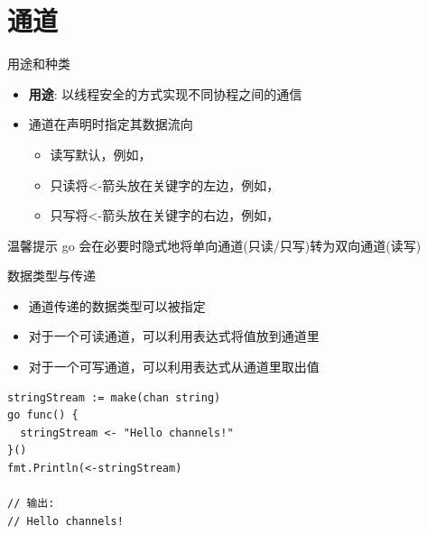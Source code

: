 \section{通道\channel }
\begin{frame}{用途和种类}
    \begin{itemize}
        \item \textbf{用途}: 以线程安全的方式实现不同协程之间的通信 
        \item 通道在声明时指定其数据流向
            \begin{itemize}
                \item \alert{读写}\quad 默认，例如，
                \item \alert{只读}\quad 将<-箭头放在关键字的左边，例如，
                \item \alert{只写}\quad 将<-箭头放在关键字的右边，例如，
            \end{itemize}
    \end{itemize}

    \begin{exampleblock}{温馨提示}
        go 会在必要时隐式地将单向通道(只读/只写)转为双向通道(读写) 
    \end{exampleblock}
\end{frame}

\begin{frame}[fragile]{数据类型与传递}
    \begin{itemize}
        \item 通道传递的数据类型可以被指定
        \item 对于一个可读通道，可以利用表达式将值放到通道里
        \item 对于一个可写通道，可以利用表达式从通道里取出值
    \end{itemize}
\begin{lstlisting}[caption={通道数据传递样例}]
stringStream := make(chan string)
go func() {
  stringStream <- "Hello channels!"
}()
fmt.Println(<-stringStream)

// 输出:
// Hello channels!    
\end{lstlisting}    
\end{frame}

